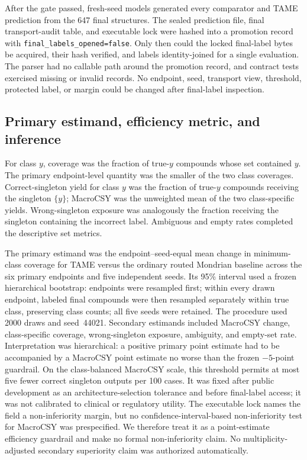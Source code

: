 After the gate passed, fresh-seed models generated every comparator and TAME prediction from the 647 final structures. The sealed prediction file, final transport-audit table, and executable lock were hashed into a promotion record with \texttt{final\_labels\_opened=false}. Only then could the locked final-label bytes be acquired, their hash verified, and labels identity-joined for a single evaluation. The parser had no callable path around the promotion record, and contract tests exercised missing or invalid records. No endpoint, seed, transport view, threshold, protected label, or margin could be changed after final-label inspection.

\subsection{Primary estimand, efficiency metric, and inference}
\label{sec:methods_inference}

For class $y$, coverage was the fraction of true-$y$ compounds whose set contained $y$. The primary endpoint-level quantity was the smaller of the two class coverages. Correct-singleton yield for class $y$ was the fraction of true-$y$ compounds receiving the singleton $\{y\}$; MacroCSY was the unweighted mean of the two class-specific yields. Wrong-singleton exposure was analogously the fraction receiving the singleton containing the incorrect label. Ambiguous and empty rates completed the descriptive set metrics.

The primary estimand was the endpoint--seed-equal mean change in minimum-class coverage for TAME versus the ordinary routed Mondrian baseline across the six primary endpoints and five independent seeds. Its 95\% interval used a frozen hierarchical bootstrap: endpoints were resampled first; within every drawn endpoint, labeled final compounds were then resampled separately within true class, preserving class counts; all five seeds were retained. The procedure used 2000 draws and seed~44021. Secondary estimands included MacroCSY change, class-specific coverage, wrong-singleton exposure, ambiguity, and empty-set rate. Interpretation was hierarchical: a positive primary point estimate had to be accompanied by a MacroCSY point estimate no worse than the frozen $-5$-point guardrail. On the class-balanced MacroCSY scale, this threshold permits at most five fewer correct singleton outputs per 100 cases. It was fixed after public development as an architecture-selection tolerance and before final-label access; it was not calibrated to clinical or regulatory utility. The executable lock names the field a non-inferiority margin, but no confidence-interval-based non-inferiority test for MacroCSY was prespecified. We therefore treat it as a point-estimate efficiency guardrail and make no formal non-inferiority claim. No multiplicity-adjusted secondary superiority claim was authorized automatically.

